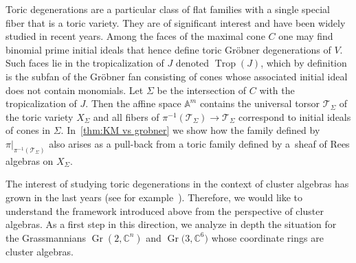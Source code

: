 \documentclass[10pt,a4paper]{amsart}
\newcommand{\thref}[1]{\ref{#1}}
\numberwithin{equation}{section}
\DeclareMathOperator{\Gr}{Gr}
\DeclareMathOperator{\trop}{Trop}
\begin{document}
Toric degenerations are a particular class of flat families with a single special fiber that is a toric variety.
They are of significant interest and have been widely studied in recent years.
Among the faces of the maximal cone $C$ one may find binomial prime initial ideals that hence define toric Gr\"obner degenerations of $V$.
Such faces lie in the tropicalization of $J$ denoted $\trop(J)$, which by definition is the subfan of the Gr\"obner fan consisting of cones whose associated initial ideal does not contain monomials.
Let $\Sigma$ be the intersection of $C$ with the tropicalization of $J$.
Then the affine space $\mathbb A^m$ contains the universal torsor $\mathcal T_\Sigma$ of the toric variety $X_\Sigma$ and all fibers of $\pi^{-1}(\mathcal T_\Sigma)\to \mathcal T_\Sigma$ correspond to initial ideals of cones in $\Sigma$.
In~\thref{thm:KM vs grobner} we show how the family defined by $\pi\vert_{\pi^{-1}(\mathcal T_\Sigma)}$ also arises as a pull-back from a toric family defined by a~sheaf of Rees algebras on $X_\Sigma$.

\medskip

The interest of studying toric degenerations in the context of cluster algebras has grown in the last years (see for example~\cite{BFMN,GHKK}).
Therefore, we would like to understand the framework introduced above from the perspective of cluster algebras.
As a first step in this direction, we analyze in depth the situation for the Grassmannians $\Gr(2,\mathbb C^n)$ and $\Gr\big(3,\mathbb C^6\big)$ whose coordinate rings are cluster algebras.
\end{document}
